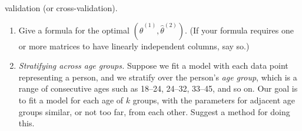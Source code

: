 \begin{enumerate}[label=(\alph*)]
	      validation (or cross-validation).
	      \begin{enumerate}[label=(\alph*)]
		      \item  Give a formula for the optimal $(\hat{\theta}^{(1)} ,
			            \hat{\theta}^{(2)} )$. (If your formula requires one or
		            more matrices to have linearly independent columns, say
		            so.)
		      \item \textit{Stratifying across age groups.} Suppose we fit a
		            model with each data point representing a person, and we
		            stratify over the person’s \textit{age group}, which is a
		            range of consecutive ages such as 18–24, 24–32, 33–45, and
		            so on. Our goal is to fit a model for each age of $k$
		            groups, with the parameters for adjacent age groups similar,
		            or not too far, from each other. Suggest a method for doing
		            this.
	      \end{enumerate}

\end{enumerate}
